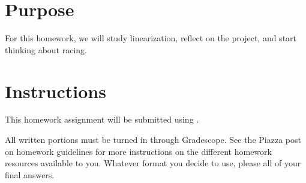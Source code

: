 
\hspace{0.5cm}

\section*{Purpose}

For this homework, we will study linearization, reflect on the project, and start thinking about racing.

\section*{Instructions}

This homework assignment will be submitted using \GSno{}.

All written portions must be turned in through Gradescope. See the Piazza post on homework guidelines for more
instructions on the different homework resources available to you. Whatever format you decide to use, please  all of your final answers.



\newpage
